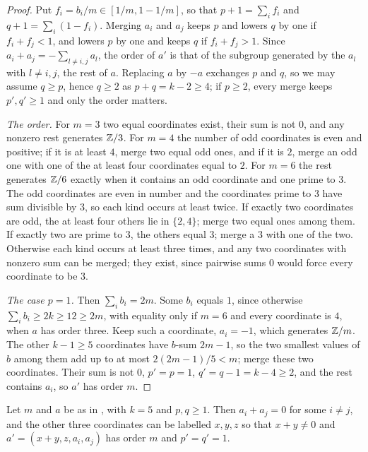 \begin{proof}
Put $f_{i}=b_{i}/m\in[1/m,1-1/m]$, so that $p+1=\sum_{i}f_{i}$ and
$q+1=\sum_{i}(1-f_{i})$. Merging $a_{i}$ and $a_{j}$ keeps $p$ and lowers $q$
by one if $f_{i}+f_{j}<1$, and lowers $p$ by one and keeps $q$ if
$f_{i}+f_{j}>1$. Since $a_{i}+a_{j}=-\sum_{l\ne i,j}a_{l}$, the order of $a'$ is
that of the subgroup generated by the $a_{l}$ with $l\ne i,j$, the rest of
$a$. Replacing $a$ by $-a$ exchanges $p$ and $q$, so we may assume $q\ge p$,
hence $q\ge2$ as $p+q=k-2\ge4$; if $p\ge2$, every merge keeps $p',q'\ge1$
and only the order matters.

\emph{The order.} For $m=3$ two equal coordinates exist, their sum is not
$0$, and any nonzero rest generates $\mathbb{Z}/3$. For $m=4$ the number of odd
coordinates is even and positive; if it is at least $4$, merge two equal odd
ones, and if it is $2$, merge an odd one with one of the at least four
coordinates equal to $2$. For $m=6$ the rest generates $\mathbb{Z}/6$ exactly when
it contains an odd coordinate and one prime to $3$. The odd coordinates
are even in number and the coordinates prime to $3$ have sum divisible by
$3$, so each kind occurs at least twice. If exactly two coordinates are
odd, the at least four others lie in $\{2,4\}$; merge two equal ones among
them. If exactly two are prime to $3$, the others equal $3$; merge a $3$
with one of the two. Otherwise each kind occurs at least three times, and
any two coordinates with nonzero sum can be merged; they exist, since
pairwise sums $0$ would force every coordinate to be $3$.

\emph{The case $p=1$.} Then $\sum_{i}b_{i}=2m$. Some $b_{i}$ equals $1$,
since otherwise $\sum_{i}b_{i}\ge2k\ge12\ge2m$, with equality only if $m=6$
and every coordinate is $4$, when $a$ has order three. Keep such a coordinate,
$a_{i}=-1$, which generates $\mathbb{Z}/m$. The other $k-1\ge5$ coordinates have
$b$-sum $2m-1$, so the two smallest values of $b$ among them add up to at most
$2(2m-1)/5<m$; merge these two coordinates. Their sum is not $0$, $p'=p=1$,
$q'=q-1=k-4\ge2$, and the rest contains $a_{i}$, so $a'$ has order $m$.
\end{proof}

\begin{lemma}\label{lem:mergefive}
Let $m$ and $a$ be as in , with $k=5$ and $p,q\ge1$. Then
$a_{i}+a_{j}=0$ for some $i\ne j$, and the other three coordinates can be
labelled $x,y,z$ so that $x+y\ne0$ and $a'=(x+y,z,a_{i},a_{j})$ has order $m$
and $p'=q'=1$.
\end{lemma}

